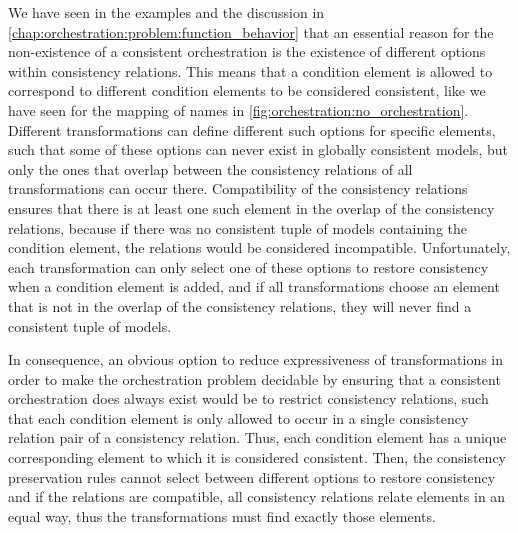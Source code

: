 We have seen in the examples and the discussion in \autoref{chap:orchestration:problem:function_behavior} that an essential reason for the non-existence of a consistent orchestration is the existence of different options within consistency relations.
This means that a condition element is allowed to correspond to different condition elements to be considered consistent, like we have seen for the mapping of names in \autoref{fig:orchestration:no_orchestration}.
Different transformations can define different such options for specific elements, such that some of these options can never exist in globally consistent models, but only the ones that overlap between the consistency relations of all transformations can occur there.
Compatibility of the consistency relations ensures that there is at least one such element in the overlap of the consistency relations, because if there was no consistent tuple of models containing the condition element, the relations would be considered incompatible.
Unfortunately, each transformation can only select one of these options to restore consistency when a condition element is added, and if all transformations choose an element that is not in the overlap of the consistency relations, they will never find a consistent tuple of models.

In consequence, an obvious option to reduce expressiveness of transformations in order to make the orchestration problem decidable by ensuring that a consistent orchestration does always exist would be to restrict consistency relations, such that each condition element is only allowed to occur in a single consistency relation pair of a consistency relation.
Thus, each condition element has a unique corresponding element to which it is considered consistent.
Then, the consistency preservation rules cannot select between different options to restore consistency and if the relations are compatible, all consistency relations relate elements in an equal way, thus the transformations must find exactly those elements.

